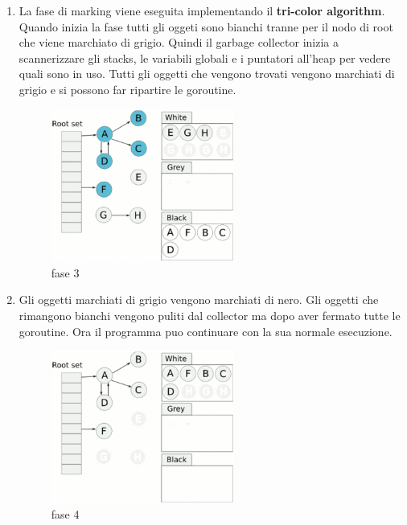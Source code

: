 \begin{enumerate}
    \item La fase di marking viene eseguita implementando il \textbf{tri-color algorithm}. Quando inizia la fase tutti gli oggeti sono bianchi tranne per il nodo di root che viene marchiato di grigio. Quindi il garbage collector inizia a scannerizzare gli stacks, le variabili globali e i puntatori all'heap per vedere quali sono in uso. \newline
    Tutti gli oggetti che vengono trovati vengono marchiati di grigio e si possono far ripartire le goroutine.
    
    \begin{figure}[!h]
        \centering
        \includegraphics[width=6cm]{sections/frame2.png}
        \caption{fase 3}
        \label{fig:my_label}
    \end{figure}
    \newpage
    \item Gli oggetti marchiati di grigio vengono marchiati di nero. Gli oggetti che rimangono bianchi vengono puliti dal collector ma dopo aver fermato tutte le goroutine. \newline
    Ora il programma puo continuare con la sua normale esecuzione.
    
    \begin{figure}[!h]
        \centering
        \includegraphics[width=6cm]{sections/frame3.png}
        \caption{fase 4}
        \label{fig:my_label}
    \end{figure}
    
    
\end{enumerate}







